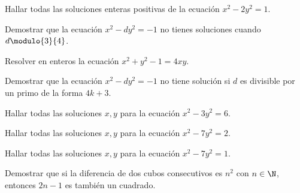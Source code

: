 \begin{exercise}
    Hallar todas las soluciones enteras positivas de la ecuación $x^2 - 2y^2 = 1$.
\end{exercise}

\begin{exercise}
    Demostrar que la ecuación $x^2 - dy^2 = -1$ no tienes soluciones cuando $d \modulo{3}{4}$.
\end{exercise}

\begin{problem}
    Resolver en enteros la ecuación $x^2 + y^2 - 1 = 4xy$.
\end{problem}

\begin{problem}
    Demostrar que la ecuación $x^2 - dy^2 = -1$ no tiene solución si $d$ es divisible por un primo de la forma $4k + 3$.
\end{problem}

\begin{problem}
    Hallar todas las soluciones $x,y$ para la ecuación $x^2 - 3y^2 = 6$.
\end{problem}

\begin{problem}
    Hallar todas las soluciones $x,y$ para la ecuación $x^2 - 7y^2 = 2$.
\end{problem}

\begin{problem}
    Hallar todas las soluciones $x,y$ para la ecuación $x^2 - 7y^2 = 1$.
\end{problem}

\begin{problem}
    Demostrar que si la diferencia de dos cubos consecutivos es $n^{2}$ con $n \in \N$, entonces $2n - 1$ es también un cuadrado.
\end{problem}